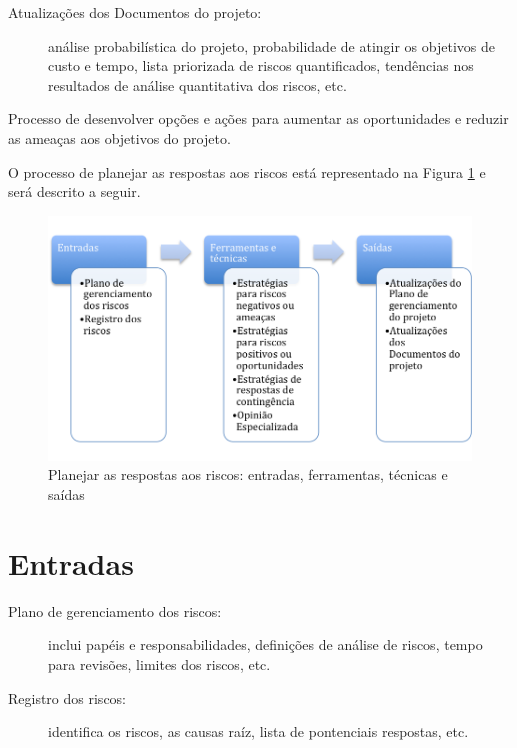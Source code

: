 \begin{description}
	
	\item[Atualizações dos Documentos do projeto:] análise probabilística do projeto, probabilidade de atingir os objetivos de custo e tempo, lista priorizada de riscos quantificados, tendências nos resultados de análise quantitativa dos riscos, etc.	
	
\end{description}



Processo de desenvolver opções e ações para aumentar as oportunidades e reduzir as ameaças aos objetivos do projeto.

O processo de planejar as respostas aos riscos está representado na Figura \ref{fig:riscos:resp:efts} e será descrito a seguir.

\begin{figure}[!h]
	\centering
	\includegraphics[scale=0.5]{Figuras/riscos_efts_resp.png}
	\caption{Planejar as respostas aos riscos: entradas, ferramentas, técnicas e saídas}
	\label{fig:riscos:resp:efts}
\end{figure}

\section{Entradas}

\begin{description}
	
	\item[Plano de gerenciamento dos riscos:] inclui papéis e responsabilidades, definições de análise de riscos, tempo para revisões, limites dos riscos, etc.
	
	\item[Registro dos riscos:] identifica os riscos, as causas raíz, lista de pontenciais respostas, etc.
	
\end{description}

